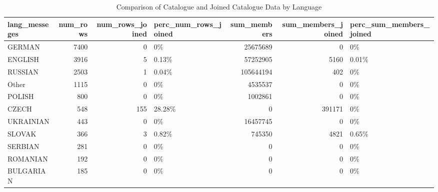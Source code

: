 \begin{table}[ht]
\centering
\begin{tabular}{lrrlrrl}
  \hline
lang\_messeges & num\_rows & num\_rows\_joined & perc\_num\_rows\_joined & sum\_members & sum\_members\_joined & perc\_sum\_members\_joined \\ 
  \hline
GERMAN & 7400 &   0 & 0\% & 25675689 &   0 & 0\% \\ 
  ENGLISH & 3916 &   5 & 0.13\% & 57252905 & 5160 & 0.01\% \\ 
  RUSSIAN & 2503 &   1 & 0.04\% & 105644194 & 402 & 0\% \\ 
  Other & 1115 &   0 & 0\% & 4535537 &   0 & 0\% \\ 
  POLISH & 800 &   0 & 0\% & 1002861 &   0 & 0\% \\ 
  CZECH & 548 & 155 & 28.28\% &   0 & 391171 & 0\% \\ 
  UKRAINIAN & 443 &   0 & 0\% & 16457745 &   0 & 0\% \\ 
  SLOVAK & 366 &   3 & 0.82\% & 745350 & 4821 & 0.65\% \\ 
  SERBIAN & 281 &   0 & 0\% &   0 &   0 & 0\% \\ 
  ROMANIAN & 192 &   0 & 0\% &   0 &   0 & 0\% \\ 
  BULGARIAN & 185 &   0 & 0\% &   0 &   0 & 0\% \\ 
   \hline
\end{tabular}
\caption{Comparison of Catalogue and Joined Catalogue Data by Language} 
\label{tab:comparison}
\end{table}
